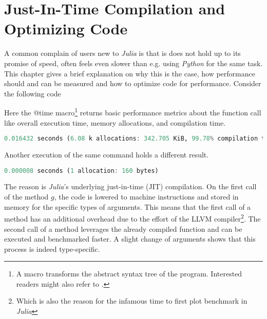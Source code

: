 \section{ Just-In-Time Compilation and Optimizing Code}
\label{JM:sec:JITOpt}

A common complain of users new to \textit{Julia} is that is does not hold up to its promise of speed, often feels even slower than e.g. using \textit{Python} for the same 
task. This chapter gives a brief explanation on why this is the case, how performance should and can be measured and how to optimize code for performance. Consider the following code



Here the @time macro\footnote{A macro transforms the abstract syntax tree of the program. Interested readers might also refer to \cite{JMKwong2020}.}
returns basic performance metrics about the function call like overall execution time, memory allocations, and compilation time.

\begin{lstlisting}[language=Julia]
    0.016432 seconds (6.08 k allocations: 342.705 KiB, 99.78% compilation time)
\end{lstlisting}

Another execution of the same command holds a different result.

\begin{lstlisting}[language=Julia]
    0.000008 seconds (1 allocation: 160 bytes)
\end{lstlisting}

The reason is \textit{Julia}'s underlying just-in-time (JIT) compilation. On the first call of the method $g$, 
the code is lowered to machine instructions and stored in memory for the specific types of arguments. This means that the first 
call of a method has an additional overhead due to the effort of the LLVM \cite{JMLattnerAdve2004} compiler\footnote{Which is also the reason for the infamous time to first plot benchmark in \textit{Julia}}.
The second call of a method leverages the already compiled function and can be executed and benchmarked faster. 
A slight change of arguments shows that this process is indeed type-specific.



